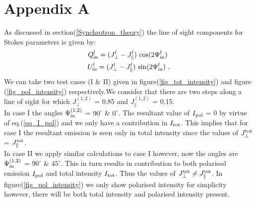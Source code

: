 \documentclass[12pt, a4 paper]{mnras}
\begin{document}
\section{Appendix A}\label{Appendix_A}
As discussed in section(\ref{Synchrotron_theory}) the line of sight components for Stokes parameters is given by:
\begin{eqnarray}
Q^l_{\rm in} = ({J_{\perp}^l} - J_{\parallel}^l) \ {\cos}(2\Psi^l_{\rm in}) \ \\ U^l_{\rm in} = ({J_{\perp}^l} - J_{\parallel}^l) \ {\sin}(2\Psi^l_{\rm in}) \ .
\end{eqnarray}
We can take two test cases (I \& II) given in figure(\ref{fig_tot_intensity}) and figure (\ref{fig_pol_intensity}) respectively.We consider that there are two steps along a line of sight for which ${J_{\perp}^{(1,2)}}$ = 0.85 and $J_{\parallel}^{(1,2)}$  = 0.15. 
\\ In case I the angles $\Psi_{\rm in}^{(1,2)}$ = $90^{\circ}$ \& $0^{\circ}$. The resultant value of $I_{\rm pol}$ = 0 by virtue of eq.(\ref{eq_I_pol}) and we only have a contribution in $I_{\rm tot}$. This implies that for case I the resultant emission is seen only in total intensity since the values of $J_{\perp}^{\rm tot}$ = $J_{\parallel}^{\rm tot}$. 
\\ In case II we apply similar calculations to case I however, now the angles are $\Psi_{\rm in}^{(1,2)}$ = $90^{\circ}$ \& $45^{\circ}$. This in turn results in contribution to both polarised emission $I_{\rm pol}$ and total intensity $I_{\rm tot}$. Thus the values of $J_{\perp}^{\rm tot} \neq J_{\parallel}^{\rm tot}$. In figure(\ref{fig_pol_intensity}) we only show polarised intensity for simplicity however, there will be both total intensity and polarised intensity present.
\end{document}
